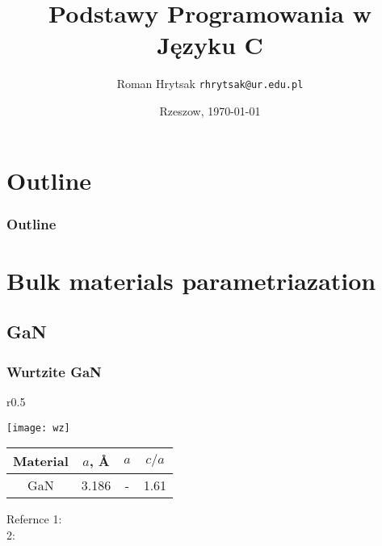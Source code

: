 \documentclass[t]{beamer}
\author[Roman Hrytsak] {Roman Hrytsak \texttt{rhrytsak@ur.edu.pl}}
\title{Podstawy Programowania w Języku C}
\date{Rzeszow, \today}
\begin{document}
\begin{frame}

\titlepage
\begin{figure}[placement h!]
\centering
{}
\label{fig.figlogo}
\end{figure}
\end{frame}
\section*{Outline}

\begin{frame}
	\frametitle{Outline}
	\tableofcontents[currentsections, sections={<1-10| handout:0>}]
\end{frame}

\section{Bulk materials parametriazation}
\subsection{GaN}

\begin{frame}
\frametitle{Wurtzite GaN}

\begin{wrapfigure}{r}{0.5\textwidth}
\begin{center}
\vspace{-50pt}
\texttt{[image: wz]}
\end{center}
\vspace{-20pt}
\label{fig.figwz}
\end{wrapfigure}


\begin{tabular}{c|c|c|c}
Material	&	$a$, \AA	& \Delta $a$	& $c/a$ \\ \hline
GaN		&	3.186		&	-	&	1.61\\ \hline
\end{tabular}




\begin{block}{Refernce}
1:\\
2:
\end{block}

\end{frame}
\end{document}
